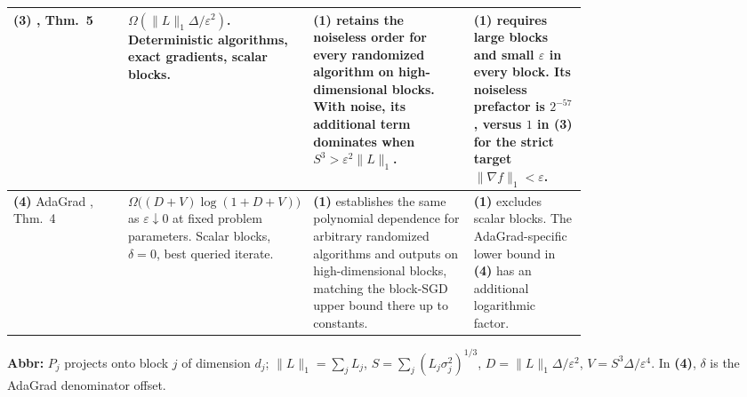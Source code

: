 \begin{table}[tp]
\begin{threeparttable}
\begin{tabularx}{\linewidth}{@{}>{\raggedright\arraybackslash}p{0.20\linewidth}>{\raggedright\arraybackslash}p{0.26\linewidth}>{\raggedright\arraybackslash}p{0.29\linewidth}>{\raggedright\arraybackslash}X@{}}
\midrule
\textbf{(3)} \citep{pmlr-v291-jiang25c}, Thm.~5
& $\Omega(\|L\|_1\Delta/\varepsilon^2)$. Deterministic algorithms, exact gradients, scalar blocks.
& \textbf{(1)} retains the noiseless order for every randomized algorithm on high-dimensional blocks. With noise, its additional term dominates when $S^3>\varepsilon^2\|L\|_1$.
& \textbf{(1)} requires large blocks and small $\varepsilon$ in every block. Its noiseless prefactor is $2^{-57}$, versus $1$ in \textbf{(3)} for the strict target $\|\nabla f\|_1<\varepsilon$. \\
\midrule
\textbf{(4)} AdaGrad \citep{pmlr-v291-jiang25c}, Thm.~4
& $\Omega\!\big((D+V)\log(1+D+V)\big)$ as $\varepsilon\downarrow0$ at fixed problem parameters. Scalar blocks, $\delta=0$, best queried iterate.
& \textbf{(1)} establishes the same polynomial dependence for arbitrary randomized algorithms and outputs on high-dimensional blocks, matching the block-SGD upper bound there up to constants.
& \textbf{(1)} excludes scalar blocks. The AdaGrad-specific lower bound in \textbf{(4)} has an additional logarithmic factor. \\
\bottomrule
\end{tabularx}
\begin{tablenotes}[flushleft]\footnotesize
\item[] \textbf{Abbr:} $P_j$ projects onto block $j$ of dimension $d_j$; $\|L\|_1=\sum_j L_j$, $S=\sum_j(L_j\sigma_j^2)^{1/3}$, $D=\|L\|_1\Delta/\varepsilon^2$, $V=S^3\Delta/\varepsilon^4$. In \textbf{(4)}, $\delta$ is the AdaGrad denominator offset.
\end{tablenotes}
\end{threeparttable}
\end{table}
